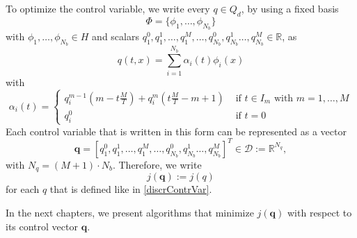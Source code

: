 To optimize the control variable, we write every $q\in Q_d$, by using a fixed basis
\begin{equation}
\label{basisFuncionsList}
\Phi=\{\phi_1,\dotsc,\phi_{N_b}\}
\end{equation}
 with $\phi_1,\dotsc,\phi_{N_b}\in H$ and scalars $q_1^0,q_1^1,\dotsc,q_1^M,\dotsc,q_{N_b}^0,q_{N_b}^1\dotsc,q_{N_b}^M\in\mathbb{R}$, as
\begin{equation}
\label{discrContrVar}
q(t,x) = \sum_{i=1}^{N_b}\alpha_i(t)\phi_i(x)
\end{equation} 
with
\begin{displaymath}
\alpha_i(t)=\begin{cases}
q_i^{m-1}\left(m-t\frac{M}{T}\right) + q_i^m\left(t\frac{M}{T}-m+1\right) & \text{ if $t\in I_m$ with $m=1,\dotsc,M$}\\
q_i^0 & \text{ if $t=0$}
\end{cases}
\end{displaymath}
Each control variable that is written in this form can be represented as a vector
\begin{displaymath}
\mathbf{q}=\left[q_1^0,q_1^1,\dotsc,q_1^M,\dotsc,q_{N_b}^0,q_{N_b}^1\dotsc,q_{N_b}^M\right]^T\in\mathcal{D}:=\mathbb{R}^{N_q},
\end{displaymath} 
with $N_q = (M+1)\cdot N_b$. Therefore, we write
\begin{displaymath}
j(\mathbf{q}):=j(q)
\end{displaymath}
for each $q$ that is defined like in \eqref{discrContrVar}.

In the next chapters, we present algorithms that minimize $j(\mathbf{q})$ with respect to its control vector $\mathbf{q}$.
































































